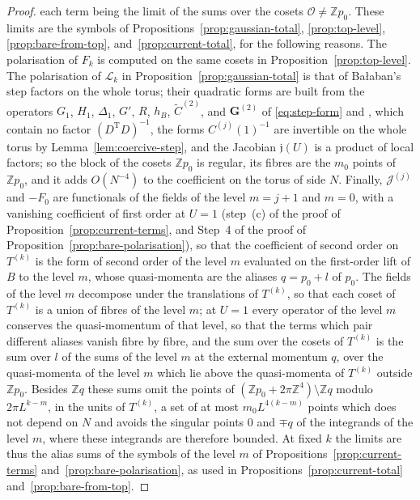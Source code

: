 \documentclass[11pt]{preprint}
\numberwithin{equation}{section}
\theoremstyle{definition}
\theoremstyle{remark}
\theoremstyle{plain}
\begin{document}
\begin{proof}
each term being the limit of the sums over the cosets $\mathcal O \neq \mathbb Zp_0$. These limits are the symbols of Propositions~\ref{prop:gaussian-total}, \ref{prop:top-level}, \ref{prop:bare-from-top}, and~\ref{prop:current-total}, for the following reasons. The polarisation of $F_k$ is computed on the same cosets in Proposition~\ref{prop:top-level}. The polarisation of $\mathcal L_k$ in Proposition~\ref{prop:gaussian-total} is that of Ba{\l}aban's step factors on the whole torus; their quadratic forms are built from the operators $G_1$, $H_1$, $\Delta_1$, $G'$, $R$, $h_B$, $\tilde C^{(2)}$, and $\mathbf G^{(2)}$ of \eqref{eq:step-form} and \cite[(3.128)--(3.129), p.~421]{BalabanPBG}, which contain no factor $(D^{\mathrm T}D)^{-1}$, the forms $C^{(j)}(1)^{-1}$ are invertible on the whole torus by Lemma~\ref{lem:coercive-step}, and the Jacobian $\mathfrak j(U)$ is a product of local factors; so the block of the cosets $\mathbb Zp_0$ is regular, its fibres are the $m_0$ points of $\mathbb Zp_0$, and it adds $O(N^{-4})$ to the coefficient on the torus of side $N$. Finally, $\mathcal J^{(j)}$ and $-F_0$ are functionals of the fields of the level $m = j + 1$ and $m = 0$, with a vanishing coefficient of first order at $U = 1$ (step~(c) of the proof of Proposition~\ref{prop:current-terms}, and Step~4 of the proof of Proposition~\ref{prop:bare-polarisation}), so that the coefficient of second order on $T^{(k)}$ is the form of second order of the level $m$ evaluated on the first-order lift of $B$ to the level $m$, whose quasi-momenta are the aliases $q = p_0 + l$ of $p_0$. The fields of the level $m$ decompose under the translations of $T^{(k)}$, so that each coset of $T^{(k)}$ is a union of fibres of the level $m$; at $U = 1$ every operator of the level $m$ conserves the quasi-momentum of that level, so that the terms which pair different aliases vanish fibre by fibre, and the sum over the cosets of $T^{(k)}$ is the sum over $l$ of the sums of the level $m$ at the external momentum $q$, over the quasi-momenta of the level $m$ which lie above the quasi-momenta of $T^{(k)}$ outside $\mathbb Zp_0$. Besides $\mathbb Zq$ these sums omit the points of $(\mathbb Zp_0 + 2\pi\mathbb Z^4) \setminus \mathbb Zq$ modulo $2\pi L^{k-m}$, in the units of $T^{(k)}$, a set of at most $m_0L^{4(k-m)}$ points which does not depend on $N$ and avoids the singular points $0$ and $\mp q$ of the integrands of the level $m$, where these integrands are therefore bounded. At fixed $k$ the limits are thus the alias sums of the symbols of the level $m$ of Propositions~\ref{prop:current-terms} and~\ref{prop:bare-polarisation}, as used in Propositions~\ref{prop:current-total} and~\ref{prop:bare-from-top}.


\end{proof}
\end{document}
